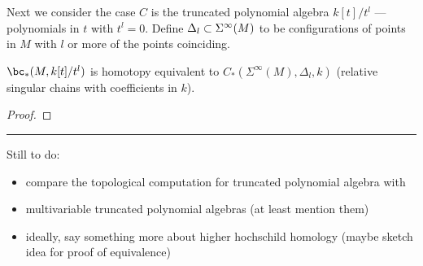
\medskip

Next we consider the case $C$ is the truncated polynomial
algebra $k[t]/t^l$ --- polynomials in $t$ with $t^l = 0$.
Define $\Delta_l \subset \Sigma^\infty(M)$ to be configurations of points in $M$ with $l$ or
more of the points coinciding.

\begin{prop}
$\bc_*(M, k[t]/t^l)$ is homotopy equivalent to $C_*(\Sigma^\infty(M), \Delta_l, k)$
(relative singular chains with coefficients in $k$).
\end{prop}

\begin{proof}
\end{proof}

\medskip
\hrule
\medskip

Still to do:
\begin{itemize}
\item compare the topological computation for truncated polynomial algebra with \cite{MR1600246}
\item multivariable truncated polynomial algebras (at least mention them)
\item ideally, say something more about higher hochschild homology (maybe sketch idea for proof of equivalence)
\end{itemize}

